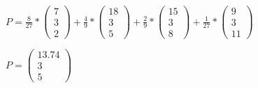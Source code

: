 $
    P
=
    \frac{8}{27} * \left(\begin{array}{c}7\\3\\2\end{array}\right)+
    \frac{4}{9} * \left(\begin{array}{c}18\\3\\5\end{array}\right)+
    \frac{2}{9} * \left(\begin{array}{c}15\\3\\8\end{array}\right)+
    \frac{1}{27} * \left(\begin{array}{c}9\\3\\11\end{array}\right)
$

$
    P
=
    \left(\begin{array}{c}
        13.74\\
        3\\
        5
    \end{array}\right)
$